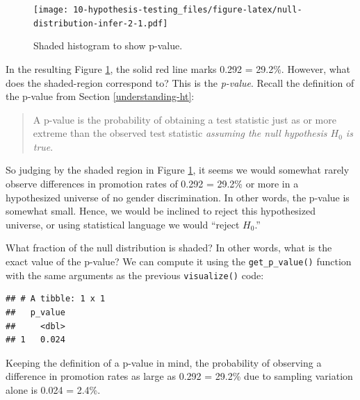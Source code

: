 \documentclass[
]{book}
\newenvironment{Shaded}{\begin{snugshade}}{\end{snugshade}}
\newcommand{\DataTypeTok}[1]{\textcolor[rgb]{0.13,0.29,0.53}{#1}}
\newcommand{\KeywordTok}[1]{\textcolor[rgb]{0.13,0.29,0.53}{\textbf{#1}}}
\newcommand{\NormalTok}[1]{#1}
\newcommand{\OperatorTok}[1]{\textcolor[rgb]{0.81,0.36,0.00}{\textbf{#1}}}
\newcommand{\StringTok}[1]{\textcolor[rgb]{0.31,0.60,0.02}{#1}}
\begin{document}
\begin{figure}
\centering
\texttt{[image: 10-hypothesis-testing\_files/figure-latex/null-distribution-infer-2-1.pdf]}
\caption{\label{fig:null-distribution-infer-2}Shaded histogram to show p-value.}
\end{figure}

In the resulting Figure \ref{fig:null-distribution-infer-2}, the solid red line marks 0.292 = 29.2\%. However, what does the shaded-region correspond to? This is the \emph{p-value}. Recall the definition of the p-value from Section \ref{understanding-ht}:

\begin{quote}
A p-value is the probability of obtaining a test statistic just as or more extreme than the observed test statistic \emph{assuming the null hypothesis \(H_0\) is true}.
\end{quote}

So judging by the shaded region in Figure \ref{fig:null-distribution-infer-2}, it seems we would somewhat rarely observe differences in promotion rates of 0.292 = 29.2\% or more in a hypothesized universe of no gender discrimination. In other words, the p-value is somewhat small. Hence, we would be inclined to reject this hypothesized universe, or using statistical language we would ``reject \(H_0\).''

What fraction of the null distribution is shaded? In other words, what is the exact value of the p-value? We can compute it using the \texttt{get\_p\_value()}  function with the same arguments as the previous \texttt{visualize()} code:

\begin{Shaded}
\end{Shaded}

\begin{verbatim}
## # A tibble: 1 x 1
##   p_value
##     <dbl>
## 1   0.024
\end{verbatim}

Keeping the definition of a p-value in mind, the probability of observing a difference in promotion rates as large as 0.292 = 29.2\% due to sampling variation alone is 0.024 = 2.4\%.
\end{document}
